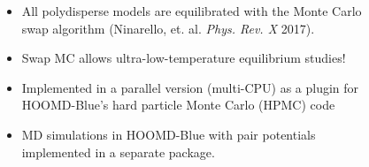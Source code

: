 \begin{frame}
\begin{columns}
\begin{column}{0.6\textwidth}
\begin{figure}
\end{figure}

\end{column}

\begin{column}{0.4\textwidth}
\begin{itemize}
    \item<1-> All polydisperse models are equilibrated with the Monte Carlo swap algorithm (Ninarello, et. al. \textit{Phys. Rev. X} 2017). 
    \item<2-> Swap MC allows ultra-low-temperature equilibrium studies!
    \item<3-> Implemented in a parallel version (multi-CPU) as a plugin for HOOMD-Blue's hard particle Monte Carlo (HPMC) code\footnotemark %
    \item<5-> MD simulations in HOOMD-Blue with pair potentials implemented in a separate package\footnotemark.
\end{itemize}

\end{column}

\end{columns}

\vspace{-40pt}

\end{frame}

